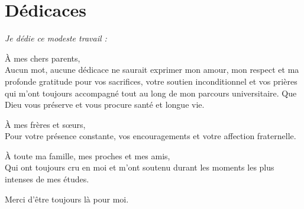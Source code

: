 \chapter*{Dédicaces}

\vspace*{2cm}

\begin{center}
    \itshape
    Je dédie ce modeste travail :

    \vspace{1.5cm}
    
    À mes chers parents,\\
    Aucun mot, aucune dédicace ne saurait exprimer mon amour, mon respect et ma profonde gratitude pour vos sacrifices, votre soutien inconditionnel et vos prières qui m'ont toujours accompagné tout au long de mon parcours universitaire. Que Dieu vous préserve et vous procure santé et longue vie.

    \vspace{1cm}
    
    À mes frères et sœurs,\\
    Pour votre présence constante, vos encouragements et votre affection fraternelle.

    \vspace{1cm}
    
    À toute ma famille, mes proches et mes amis,\\
    Qui ont toujours cru en moi et m'ont soutenu durant les moments les plus intenses de mes études.

    \vspace{1.5cm}
    Merci d'être toujours là pour moi.
\end{center}
